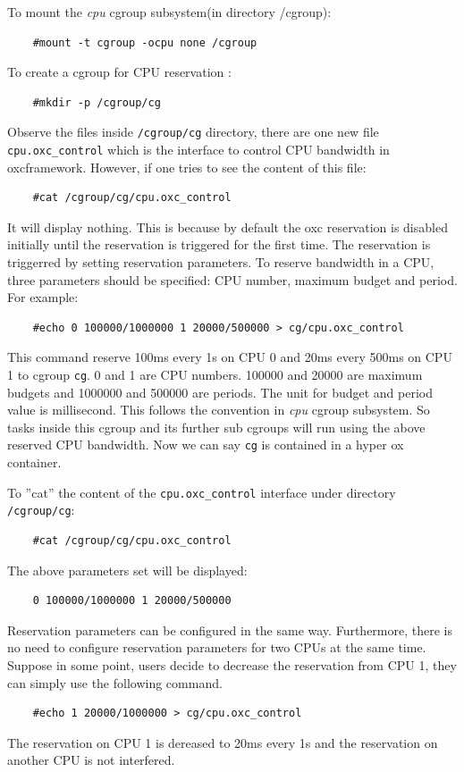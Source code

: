To mount the \emph{cpu} cgroup subsystem(in directory /cgroup):
\begin{lstlisting}
	#mount -t cgroup -ocpu none /cgroup
\end{lstlisting} 
To create a cgroup for CPU reservation :
\begin{lstlisting}
	#mkdir -p /cgroup/cg
\end{lstlisting}
Observe the files inside \texttt{/cgroup/cg} directory, there are one
new file \texttt{cpu.oxc\_control} which is the interface to control
CPU bandwidth in oxcframework. However, if one tries to see the content
of this file:
\begin{lstlisting}
	#cat /cgroup/cg/cpu.oxc_control
\end{lstlisting}
It will display nothing. This is because by default the oxc reservation
is disabled initially until the reservation is triggered for the first 
time. The reservation is triggerred by setting reservation parameters.
To reserve bandwidth in a CPU, three parameters should be specified:
CPU number, maximum budget and period. For example:
\begin{lstlisting}
	#echo 0 100000/1000000 1 20000/500000 > cg/cpu.oxc_control
\end{lstlisting}
This command reserve 100ms every 1s on CPU 0 and 20ms every 500ms on CPU 1
to cgroup \texttt{cg}. 0 and 1 are CPU numbers. 100000 and 20000 are maximum
budgets and 1000000 and 500000 are periods. The unit for budget and period
value is millisecond. This follows the convention in \emph{cpu} cgroup
subsystem. So tasks inside this cgroup and its further sub cgroups will
run using the above reserved CPU bandwidth. Now we can say \texttt{cg} is
contained in a hyper ox container.

To ''cat'' the content of the \texttt{cpu.oxc\_control} interface under
directory \texttt{/cgroup/cg}:
\begin{lstlisting}
	#cat /cgroup/cg/cpu.oxc_control
\end{lstlisting}
The above parameters set will be displayed:
\begin{lstlisting}
	0 100000/1000000 1 20000/500000
\end{lstlisting}

Reservation parameters can be configured in the same way. Furthermore,
there is no need to configure reservation parameters for two CPUs at 
the same time. Suppose in some point, users decide to decrease the 
reservation from CPU 1, they can simply use the following command.
\begin{lstlisting}
	#echo 1 20000/1000000 > cg/cpu.oxc_control
\end{lstlisting}
The reservation on CPU 1 is dereased to 20ms every 1s and the reservation
on another CPU is not interfered. 

